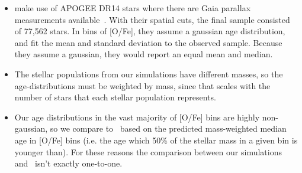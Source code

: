 \documentclass[a4paper, fleqn, usenatbib, useAMS]{mnras}
\begin{document}
\begin{itemize} 
	\item \citet{Feuillet2019} make use of APOGEE DR14 stars where there are 
	Gaia parallax measurements available~\citep{GaiaDR2}. With their spatial 
	cuts, the final sample consisted of 77,562 stars. In bins of [O/Fe], they 
	assume a gaussian age distribution, and fit the mean and standard deviation 
	to the observed sample. Because they assume a gaussian, they would report 
	an equal mean and median. 

	\item The stellar populations from our simulations have different masses, 
	so the age-distributions must be weighted by mass, since that scales with 
	the number of stars that each stellar population represents. 

	\item Our age distributions in the vast majority of [O/Fe] bins are 
	highly non-gaussian, so we compare to~\citet{Feuillet2019} based on the 
	predicted mass-weighted median age in [O/Fe] bins (i.e. the age which 50\% 
	of the stellar mass in a given bin is younger than). For these reasons the 
	comparison between our simulations and~\citet{Feuillet2019} isn't exactly 
	one-to-one. 
\end{itemize}
\end{document}
